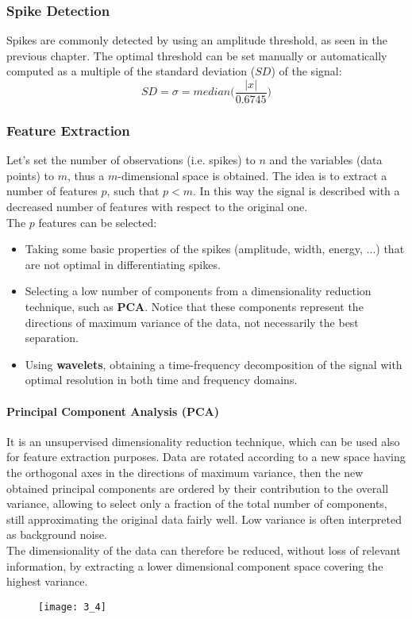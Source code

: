 \subsubsection{Spike Detection}
Spikes are commonly detected by using an amplitude threshold, as seen in the previous chapter. The optimal threshold can be set manually or automatically computed as a multiple of the standard deviation (\(SD\)) of the signal:
\begin{equation*}
    SD=\sigma=median\biggl(\frac{|x|}{0.6745}\biggr)
\end{equation*}
\subsubsection{Feature Extraction}
Let's set the number of observations (i.e. spikes) to \(n\) and the variables (data points) to \(m\), thus a \(m\)-dimensional space is obtained. The idea is to extract a number of features \(p\), such that \(p<m\). In this way the signal is described with a decreased number of features with respect to the original one.\\
The \(p\) features can be selected:
\begin{itemize}
    \item Taking some basic properties of the spikes (amplitude, width, energy, ...) that are not optimal in differentiating spikes.
    \item Selecting a low number of components from a dimensionality reduction technique, such as \textbf{PCA}. Notice that these components represent the directions of maximum variance of the data, not necessarily the best separation.
    \item Using \textbf{wavelets}, obtaining a time-frequency decomposition of the signal with optimal resolution in both time and frequency domains.
\end{itemize}
\paragraph{Principal Component Analysis (PCA)}
It is an unsupervised dimensionality reduction technique, which can be used also for feature extraction purposes. Data are rotated according to a new space having the orthogonal axes in the directions of maximum variance, then the new obtained principal components are ordered by their contribution to the overall
variance, allowing to select only a fraction of the total number of components, still approximating the original data fairly well. Low variance is often interpreted as background noise.\\
The dimensionality of the data can therefore be reduced, without loss of relevant information, by extracting a lower dimensional component space covering the highest variance. 
\begin{figure}[H]
    \texttt{[image: 3\_4]}
    \centering
\end{figure}
